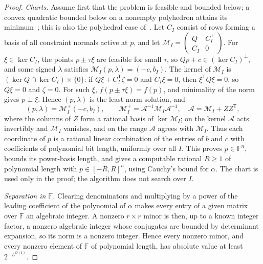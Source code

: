 \begin{proof}
\emph{Charts.} Assume first that the problem is feasible and bounded below; a
convex quadratic bounded below on a nonempty polyhedron attains its
minimum~\cite{FrankWolfe1956}; this is also the polyhedral case
of~\cite[Corollary~2, in the numbering of the 1997 report]{LuoZhang1999}.
Let $C_I$ consist of rows forming a basis of all constraint normals active
at $p$, and let
$\mathcal M_I=\left(\begin{smallmatrix}Q&C_I^{\mathsf T}\\C_I&0\end{smallmatrix}
\right)$. For $\xi\in\ker C_I$, the points $p\pm\tau\xi$ are feasible for small
$\tau$, so $Qp+c\in(\ker C_I)^\perp$, and some signed $\lambda$ satisfies
$\mathcal M_I(p,\lambda)=(-c,b_I)$. The kernel of $\mathcal M_I$ is
$(\ker Q\cap\ker C_I)\times\{0\}$: if $Q\xi+C_I^{\mathsf T}\zeta=0$ and
$C_I\xi=0$, then $\xi^{\mathsf T}Q\xi=0$, so $Q\xi=0$ and $\zeta=0$. For such
$\xi$, $f(p\pm\tau\xi)=f(p)$, and minimality of the norm gives $p\perp\xi$.
Hence $(p,\lambda)$ is the least-norm solution, and
\[
(p,\lambda)=\mathcal M_I^+(-c,b_I),\qquad
\mathcal M_I^+=\mathcal A^{-1}\mathcal M_I\mathcal A^{-1},\quad
\mathcal A=\mathcal M_I+ZZ^{\mathsf T},
\]
where the columns of $Z$ form a rational basis of $\ker\mathcal M_I$; on the
kernel $\mathcal A$ acts invertibly and $\mathcal M_I$ vanishes, and on the
range $\mathcal A$ agrees with $\mathcal M_I$. Thus each coordinate of $p$ is a
rational linear combination of the entries of $b$ and $c$ with coefficients of
polynomial bit length, uniformly over all $I$. This proves $p\in\mathbb F^n$,
bounds its power-basis length, and gives a computable rational $R\ge1$ of
polynomial length with $p\in[-R,R]^n$, using Cauchy's bound for $\alpha$. The
chart is used only in the proof; the algorithm does not search over $I$.

\emph{Separation in $\mathbb F$.} Clearing denominators and multiplying by a
power of the leading coefficient of the polynomial of $\alpha$ makes every
entry of a given matrix over $\mathbb F$ an algebraic integer. A nonzero
$r\times r$ minor is then, up to a known integer factor, a nonzero algebraic
integer whose conjugates are bounded by determinant expansion, so its norm is
a nonzero integer. Hence every nonzero minor, and every nonzero element of
$\mathbb F$ of polynomial length, has absolute value at least $2^{-L^{O(1)}}$.


\end{proof}
